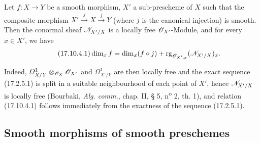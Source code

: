 \begin{corollary}[17.10.4]
\label{IV.17.10.4}
Let $f:X\to Y$ be a smooth morphism, $X'$ a sub-prescheme of $X$ such that the composite morphism $X'\xrightarrow{j}X\xrightarrow{f}Y$ (where $j$ is the canonical injection) is smooth. Then the conormal sheaf $\mathscr{N}_{X'/X}$ is a locally free $\mathscr{O}_{X'}$-Module, and for every $x\in X'$, we have
\begin{equation}
\label{IV.17.10.4.1}
\tag{17.10.4.1}
\dim_x f=\dim_x(f\circ j)+\operatorname{rg}_{\mathscr{O}_{X',x}}(\mathscr{N}_{X'/X})_x.
\end{equation}
\end{corollary}

Indeed, $\varOmega^1_{X/Y}\otimes_{\mathscr{O}_X}\mathscr{O}_{X'}$ and $\varOmega^1_{X'/Y}$ are then locally free and the exact sequence (17.2.5.1) is split in a suitable neighbourhood of each point of $X'$, hence $\mathscr{N}_{X'/X}$ is locally free (Bourbaki, \emph{Alg. comm.}, chap. II, § 5, n\textsuperscript{o} 2, th. 1), and relation (17.10.4.1) follows immediately from the exactness of the sequence (17.2.5.1).

\subsection{Smooth morphisms of smooth preschemes}

